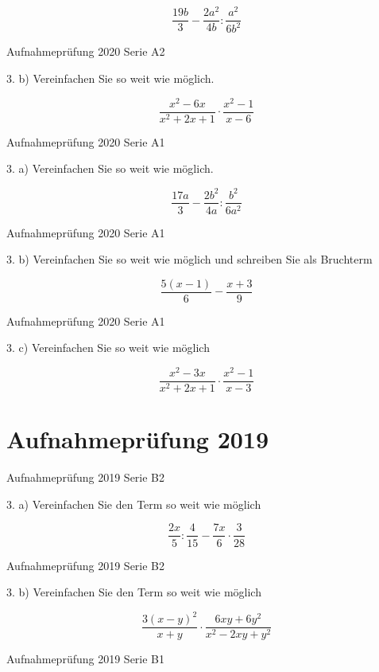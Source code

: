 $$\frac{19b}{3} - \frac{2a^2}{4b} : \frac{a^2}{6b^2}$$

Aufnahmeprüfung 2020 Serie A2

3. b) Vereinfachen Sie so weit wie möglich.

$$\frac{x^2-6x}{x^2+2x+1} \cdot{} \frac{x^2-1}{x-6}$$

Aufnahmeprüfung 2020 Serie A1

3. a) Vereinfachen Sie so weit wie möglich.

$$\frac{17a}{3} - \frac{2b^2}{4a}  :   \frac{b^2}{6a^2}$$

Aufnahmeprüfung 2020 Serie A1

3. b) Vereinfachen Sie so weit wie möglich und schreiben Sie als Bruchterm

$$\frac{5(x-1)}{6} - \frac{x+3}{9}$$

Aufnahmeprüfung 2020 Serie A1

3. c) Vereinfachen Sie so weit wie möglich

$$\frac{x^2-3x}{x^2+2x+1} \cdot{} \frac{x^2-1}{x-3}$$

\section*{Aufnahmeprüfung 2019}
Aufnahmeprüfung 2019 Serie B2

3. a) Vereinfachen Sie den Term so weit wie möglich

$$\frac{2x}{5} : \frac{4}{15} - \frac{7x}{6} \cdot{} \frac{3}{28}$$

Aufnahmeprüfung 2019 Serie B2

3. b) Vereinfachen Sie den Term so weit wie möglich

$$\frac{3(x-y)^2}{x+y} \cdot{} \frac{6xy+6y^2}{x^2-2xy+y^2}$$

Aufnahmeprüfung 2019 Serie B1

